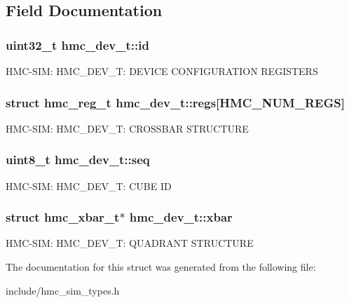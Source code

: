 \subsection{Field Documentation}
\hypertarget{structhmc__dev__t_a1214ed74d329186a43dfcb4d82e0c7a0}{
\subsubsection[{id}]{\setlength{\rightskip}{0pt plus 5cm}uint32\-\_\-t hmc\-\_\-dev\-\_\-t\-::id}}\label{structhmc__dev__t_a1214ed74d329186a43dfcb4d82e0c7a0}
H\-M\-C-\/\-S\-I\-M\-: H\-M\-C\-\_\-\-D\-E\-V\-\_\-\-T\-: D\-E\-V\-I\-C\-E C\-O\-N\-F\-I\-G\-U\-R\-A\-T\-I\-O\-N R\-E\-G\-I\-S\-T\-E\-R\-S \hypertarget{structhmc__dev__t_a5ce07cc42f7bb6e69fcf918354be02f1}{
\subsubsection[{regs}]{\setlength{\rightskip}{0pt plus 5cm}struct {\bf hmc\-\_\-reg\-\_\-t} hmc\-\_\-dev\-\_\-t\-::regs\mbox{[}H\-M\-C\-\_\-\-N\-U\-M\-\_\-\-R\-E\-G\-S\mbox{]}}}\label{structhmc__dev__t_a5ce07cc42f7bb6e69fcf918354be02f1}
H\-M\-C-\/\-S\-I\-M\-: H\-M\-C\-\_\-\-D\-E\-V\-\_\-\-T\-: C\-R\-O\-S\-S\-B\-A\-R S\-T\-R\-U\-C\-T\-U\-R\-E \hypertarget{structhmc__dev__t_aff7e17716e5d00e2d796f88e42c3793a}{
\subsubsection[{seq}]{\setlength{\rightskip}{0pt plus 5cm}uint8\-\_\-t hmc\-\_\-dev\-\_\-t\-::seq}}\label{structhmc__dev__t_aff7e17716e5d00e2d796f88e42c3793a}
H\-M\-C-\/\-S\-I\-M\-: H\-M\-C\-\_\-\-D\-E\-V\-\_\-\-T\-: C\-U\-B\-E I\-D \hypertarget{structhmc__dev__t_ac335689014f65c41ec89b2caeeca7a27}{
\subsubsection[{xbar}]{\setlength{\rightskip}{0pt plus 5cm}struct {\bf hmc\-\_\-xbar\-\_\-t}$\ast$ hmc\-\_\-dev\-\_\-t\-::xbar}}\label{structhmc__dev__t_ac335689014f65c41ec89b2caeeca7a27}
H\-M\-C-\/\-S\-I\-M\-: H\-M\-C\-\_\-\-D\-E\-V\-\_\-\-T\-: Q\-U\-A\-D\-R\-A\-N\-T S\-T\-R\-U\-C\-T\-U\-R\-E 

The documentation for this struct was generated from the following file\-:\begin{DoxyCompactItemize}
\item 
include/hmc\-\_\-sim\-\_\-types.\-h\end{DoxyCompactItemize}
